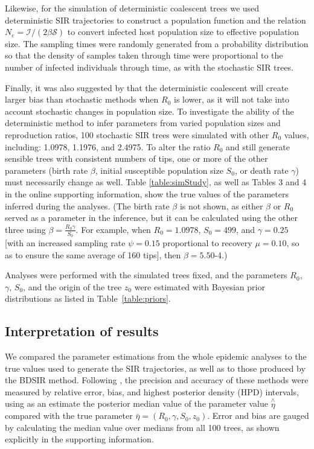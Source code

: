 \documentclass[12pt,titlepage]{article}
\newcommand{\St}{\mathcal{S}}
\newcommand{\It}{\mathcal{I}}
\newcommand{\stochSIR}{stochastic SIR}
\newcommand{\BDSIR}{BDSIR}
\begin{document}
Likewise, for the simulation of deterministic coalescent trees we used deterministic SIR 
trajectories to construct a population function and the relation $N_e = \It/(2{\beta}\St)$ to convert 
infected host population size to effective population size.  The sampling times were randomly generated 
from a probability distribution so that the density of samples taken through time were 
proportional to the number of infected individuals through time, as with the \stochSIR{} trees.

Finally, it was also suggested by \cite{Stadler:2014} that the deterministic coalescent will create larger bias than stochastic methods 
when $R_0$ is lower, as it will not take into account stochastic changes in population size.  To investigate the ability of the deterministic method to infer parameters from varied population sizes and reproduction ratios, 
100 stochastic SIR trees were simulated with other $R_0$ values, including:  1.0978, 1.1976, and 2.4975.  
To alter the ratio $R_{0}$ and still generate sensible trees with consistent numbers of tips, one or more of the other parameters (birth rate $\beta$, initial susceptible population size $S_0$, or death rate $\gamma$) must necessarily change as well.  
Table \ref{table:simStudy}, as well as Tables 3 and 4 in the online supporting information, show the true values of the parameters inferred during the analyses.  (The birth rate $\beta$ is not shown, as either $\beta$ or $R_0$ served as a parameter in the inference, but it can 
be calculated using the other three using $\beta = \frac{R_{0} \gamma}{S_{0}}$.  For example, when ${R_0} = 1.0978$, ${S_0}=499$, and $\gamma=0.25$ [with an increased sampling rate $\psi=0.15$ proportional to recovery $\mu=0.10$, so as to ensure the same average 
of 160 tips], then $\beta=5.50$\mbox{-4}.)

Analyses were performed with the simulated trees fixed, and the parameters $R_0$, $\gamma$, $S_{0}$, and the origin of the tree $z_0$ were 
estimated with Bayesian prior distributions as listed in Table~\ref{table:priors}.

\subsection{Interpretation of results}

We compared the parameter estimations from the whole epidemic analyses to the true values 
used to generate the SIR trajectories, as well as to those produced by the \BDSIR{} method.
%
%
%
Following \cite{Kuhnert:2014}, the precision and accuracy of these methods were measured by 
relative error, bias, and highest posterior density (HPD) intervals, using as an estimate the posterior 
median value of the parameter value $\overset{\wedge}{\eta}$ compared with the true parameter 
$\bar{\eta} = (R_{0}, \gamma, S_{0}, z_{0})$.  Error and bias are gauged by calculating the 
median value over medians from all 100 trees, as shown explicitly in the supporting information.
\end{document}
